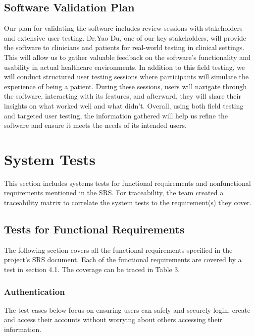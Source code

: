 \documentclass[12pt, titlepage]{article}
\begin{document}
\subsection{Software Validation Plan}

Our plan for validating the software includes review sessions with 
stakeholders and extensive user testing. Dr.Yao Du, one of our key 
stakeholders, will provide the software to clinicians and patients for 
real-world testing in clinical settings. This will allow us to gather 
valuable feedback on the software’s functionality and usability in 
actual healthcare environments. In addition to this field testing, we 
will conduct structured user testing sessions where participants will 
simulate the experience of being a patient. During these sessions, 
users will navigate through the software, interacting with its features,
and afterward, they will share their insights on what worked well and 
what didn’t. Overall, using both field testing and targeted user testing, the information
gathered will help us refine the 
software and ensure it meets the needs of its intended users. 

\newpage
\section{System Tests}
\hspace{2em}This section includes systems tests for functional requirements and nonfunctional
requirements mentioned in the SRS. For traceability, the team created a traceability
matrix to correlate the system tests to the requirement(s) they cover.

\subsection{Tests for Functional Requirements}
\hspace{2em}The following section covers all the functional requirements specified in the project's
SRS document. Each of the functional requirements are covered by a test in section 4.1. The coverage
can be traced in Table 3.

\subsubsection{Authentication}

\hspace{2em}The test cases below focus on ensuring users can safely and securely login, create and access
their accounts without worrying about others accessing their information.
\end{document}
